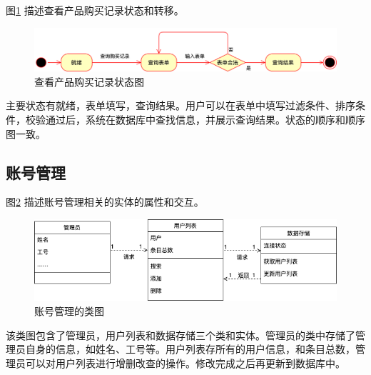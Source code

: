 \documentclass[a4paper]{ctexart}
\begin{document}
图\ref{fig:查看产品购买记录状态图} 描述查看产品购买记录状态和转移。
\begin{figure}[H]
\centering
\includegraphics[scale=0.3]{image/4_8状态图.png}
\caption{查看产品购买记录状态图}
\label{fig:查看产品购买记录状态图}
\end{figure}
主要状态有就绪，表单填写，查询结果。用户可以在表单中填写过滤条件、排序条件，校验通过后，系统在数据库中查找信息，并展示查询结果。状态的顺序和顺序图一致。\\


\subsection{账号管理}
图\ref{fig:账号管理的类图} 描述账号管理相关的实体的属性和交互。
\begin{figure}[H]
\centering
\includegraphics[scale=0.5]{image/5_1类图.png}
\caption{账号管理的类图}
\label{fig:账号管理的类图}
\end{figure}
该类图包含了管理员，用户列表和数据存储三个类和实体。管理员的类中存储了管理员自身的信息，如姓名、工号等。用户列表存所有的用户信息，和条目总数，管理员可以对用户列表进行增删改查的操作。修改完成之后再更新到数据库中。\\
\end{document}
